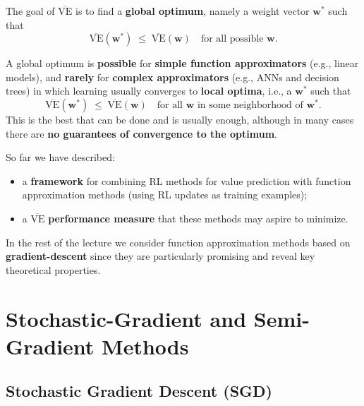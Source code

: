 \documentclass[11pt,a4paper]{article}
\theoremstyle{definition}
\theoremstyle{plain}
\theoremstyle{remark}
\begin{document}
The goal of $\overline{\mathrm{VE}}$ is to find a \textbf{global optimum}, namely a weight vector $\mathbf{w}^*$ such that
\[
    \overline{\mathrm{VE}}(\mathbf{w}^*) \;\leq\; \overline{\mathrm{VE}}(\mathbf{w}) \quad \text{for all possible } \mathbf{w}.
\]

\begin{tcolorbox}[colback=yellow!10!white, colframe=orange!80!black, title={Local vs Global Optima}]
A global optimum is \textbf{possible} for \textbf{simple function approximators} (e.g., linear models), and \textbf{rarely} for \textbf{complex approximators} (e.g., ANNs and decision trees) in which learning usually converges to \textbf{local optima}, i.e., a $\mathbf{w}^*$ such that
\[
    \overline{\mathrm{VE}}(\mathbf{w}^*) \;\leq\; \overline{\mathrm{VE}}(\mathbf{w}) \quad \text{for all } \mathbf{w} \text{ in some neighborhood of } \mathbf{w}^*.
\]
This is the best that can be done and is usually enough, although in many cases there are \textbf{no guarantees of convergence to the optimum}.
\end{tcolorbox}

\begin{tcolorbox}[colback=blue!5!white, colframe=blue!60!black, title={In Summary}]
So far we have described:
\begin{itemize}
    \item a \textbf{framework} for combining RL methods for value prediction with function approximation methods (using RL updates as training examples);
    \item a $\overline{\mathrm{VE}}$ \textbf{performance measure} that these methods may aspire to minimize.
\end{itemize}
In the rest of the lecture we consider function approximation methods based on \textbf{gradient-descent} since they are particularly promising and reveal key theoretical properties.
\end{tcolorbox}

\section{Stochastic-Gradient and Semi-Gradient Methods}

\subsection{Stochastic Gradient Descent (SGD)}
\end{document}
